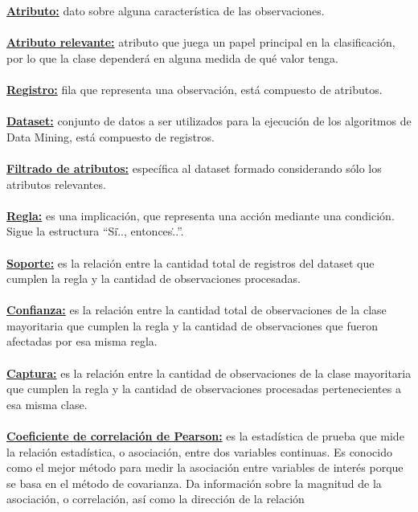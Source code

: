             \hfill \break
            \underline{\textbf{Atributo:}}  dato sobre alguna característica de las
            observaciones.\\\\
            \underline{\textbf{Atributo relevante:}} atributo que juega un papel principal
            en la clasificación, por lo que la clase dependerá en alguna medida de
            qué valor tenga.\\\\
            \underline{\textbf{Registro:}} fila que representa una observación, está
            compuesto de atributos.\\\\
            \underline{\textbf{Dataset:}} conjunto de datos a ser utilizados para la
            ejecución de los algoritmos de Data Mining, está compuesto de registros.\\\\
            \underline{\textbf{Filtrado de atributos:}} específica al dataset formado
            considerando sólo los atributos relevantes.\\\\
            \underline{\textbf{Regla:}} es una implicación, que representa una acción
            mediante una condición. Sigue la estructura “Si\..., entonces\...”.\\\\
            \underline{\textbf{Soporte:}} es la relación entre la cantidad total de
            registros del dataset que cumplen la regla y la cantidad de observaciones
            procesadas.\\\\
            \underline{\textbf{Confianza:}} es la relación entre la cantidad total de
            observaciones de la clase mayoritaria que cumplen la regla y la cantidad
            de observaciones que fueron afectadas por esa misma regla.\\\\
            \underline{\textbf{Captura:}} es la relación entre la cantidad de
            observaciones de la clase mayoritaria que cumplen la regla y la cantidad de
            observaciones procesadas pertenecientes a esa misma clase.\\\\
            \underline{\textbf{Coeficiente de correlación de Pearson:}} es la estadística
            de prueba que mide la relación estadística, o asociación, entre dos
            variables continuas. Es conocido como el mejor método para medir la
            asociación entre variables de interés porque se basa en el método de
            covarianza. Da información sobre la magnitud de la asociación, o
            correlación, así como la dirección de la relación\\\\

